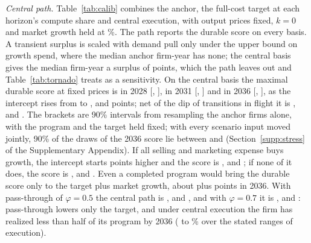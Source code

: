 \emph{Central path.} Table~\ref{tab:calib} combines the anchor, the full-cost target at each horizon's compute share and central execution, with output prices fixed, $k=0$ and market growth held at \CenG\%. The path reports the durable score on every basis. A transient surplus is scaled with demand pull only under the upper bound on growth spend, where the median anchor firm-year has none; the central basis gives the median firm-year a surplus of \AnchorPiNetMed{} points, which the path leaves out and Table~\ref{tab:tornado} treats as a sensitivity. On the central basis the maximal durable score at fixed prices is \CenREight{} in 2028 [\CenREightLo, \CenREightHi], \CenROne{} in 2031 [\CenROneLo, \CenROneHi] and \CenRSix{} in 2036 [\CenRSixLo, \CenRSixHi], as the intercept rises from \AnchorMzeroNetMed{} to \CenMzeroEight, \CenMzeroOne{} and \CenMzeroSix{} points; net of the dip of transitions in flight it is \CenREightNet, \CenROneNet{} and \CenRSixNet. The brackets are 90\% intervals from resampling the anchor firms alone, with the program and the target held fixed; with every scenario input moved jointly, 90\% of the draws of the 2036 score lie between \StNetSixPFive{} and \StNetSixPNinetyFive{} (Section~\ref{supp:stress} of the Supplementary Appendix). If all selling and marketing expense buys growth, the intercept starts \AnchorShiftNet{} points higher and the score is \CenREightAllSM, \CenROneAllSM{} and \CenRSixAllSM; if none of it does, the score is \CenRLbEight, \CenRLbOne{} and \CenRLbSix. Even a completed program would bring the durable score only to the target plus market growth, about \CenTargetSix{} plus \CenG{} points in 2036. With pass-through of $\varphi=0.5$ the central path is \CenRPhiHalfEight, \CenRPhiHalfOne{} and \CenRPhiHalfSix, and with $\varphi=0.7$ it is \CenRPhiSevenEight, \CenRPhiSevenOne{} and \CenRPhiSevenSix: pass-through lowers only the target, and under central execution the firm has realized less than half of its program by 2036 (\StRealMin{} to \StRealMax\% over the stated ranges of execution).



